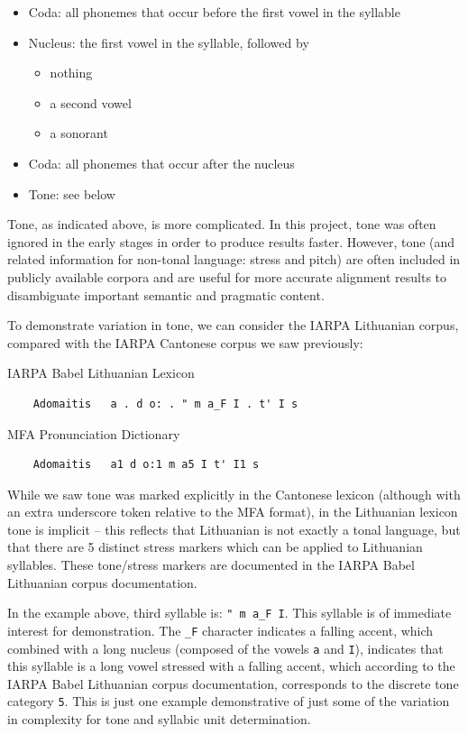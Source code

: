 \documentclass[11pt]{article}
\begin{document}
\begin{itemize}
  \item Coda: all phonemes that occur before the first vowel in the syllable
  \item Nucleus: the first vowel in the syllable, followed by\begin{itemize}\item nothing\item a second vowel \item a sonorant\end{itemize}
  \item Coda: all phonemes that occur after the nucleus
  \item Tone: see below
\end{itemize}

Tone, as indicated above, is more complicated. In this project, tone was often ignored in the early stages in order to produce results faster. However, tone (and related information for non-tonal language: stress and pitch) are often included in publicly available corpora and are useful for more accurate alignment results to disambiguate important semantic and pragmatic content.

To demonstrate variation in tone, we can consider the IARPA Lithuanian corpus, compared with the IARPA Cantonese corpus we saw previously: \\

  \begin{singlespace}
    \noindent IARPA Babel Lithuanian Lexicon
    \begin{verbatim}
    Adomaitis   a . d o: . " m a_F I . t' I s
    \end{verbatim}
    MFA Pronunciation Dictionary
    \begin{verbatim}
    Adomaitis   a1 d o:1 m a5 I t' I1 s
    \end{verbatim}
  \end{singlespace}

  While we saw tone was marked explicitly in the Cantonese lexicon (although with an extra underscore token relative to the MFA format), in the Lithuanian lexicon tone is implicit -- this reflects that Lithuanian is not exactly a tonal language, but that there are 5 distinct stress markers which can be applied to Lithuanian syllables. These tone/stress markers are documented in the IARPA Babel Lithuanian corpus documentation\cite{benowitz_iarpa_2019}. 

  In the example above, third syllable is: \verb|" m a_F I|. This syllable is of immediate interest for demonstration. The \verb|_F| character indicates a falling accent, which combined with a long nucleus (composed of the vowels \verb|a| and \verb|I|), indicates that this syllable is a long vowel stressed with a falling accent, which according to the IARPA Babel Lithuanian corpus documentation, corresponds to the discrete tone category \verb|5|. This is just one example demonstrative of just some of the variation in complexity for tone and syllabic unit determination. 
\end{document}
